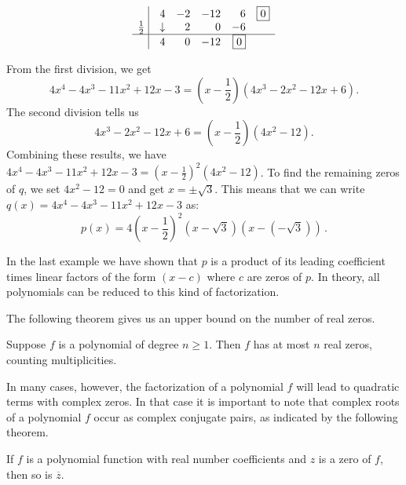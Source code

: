 \begin{example}
\begin{enumerate}
\[\begin{array}{rrrrrr}
 \vline&  4  &   -2  & -12 & 6 &  \fbox{$0$}  \\
    
    \frac{1}{2} \, \,    \vline & \downarrow &  2  &  0  & -6 &\\ \hline
      
       \vline & 4  &   0  & -12 & \fbox{0} &   \\  



\end{array}\]

From the first division, we get $$4x^4-4x^3-11x^2+12x-3=\left(x-\frac{1}{2}\right) \left(4x^3-2x^2-12x+6\right).$$
The second division tells us $$4x^3-2x^2-12x+6=\left(x-\frac{1}{2}\right)\left(4x^2-12\right).$$
Combining these results, we have  $4x^4-4x^3-11x^2+12x-3 = \left(x-\frac{1}{2}\right)^2\left(4x^2-12\right)$.  To find the remaining zeros of $q$, we set $4x^2-12=0$ and get $x = \pm \sqrt{3}$. This means that we can write  $q(x) = 4x^4-4x^3-11x^2+12x-3$ as:
$$
p(x) = 4\left(x-\frac{1}{2}\right)^2 \left(x-\sqrt{3}\right)\left(x - \left(-\sqrt{3}\right)\right)\,.
$$

\end{enumerate}
\end{example}


In the last example we have shown that $p$ is a product of its leading coefficient times linear factors of the form $(x-c)$ where $c$ are zeros of $p$. In theory, all polynomials can be reduced to this kind of factorization. \fi  


The following theorem gives us an upper bound on the number of real zeros. 

\begin{theorem}  \label{nzerosreal}
 Suppose $f$ is a polynomial of degree $n \geq 1$.  Then $f$ has at most $n$ real zeros, counting multiplicities.
\end{theorem}


\ifcourse
In many cases, however, the factorization of a polynomial $f$ will lead to quadratic terms with complex zeros. In that case it is important to note that complex roots of a polynomial $f$ occur as complex conjugate pairs, as indicated by the following theorem.

\begin{theorem} \label{conjugatepairsthm}
If $f$ is a polynomial function with real number coefficients and $z$ is a zero of $f$, then so is $\overline{z}$. 

\end{theorem}


